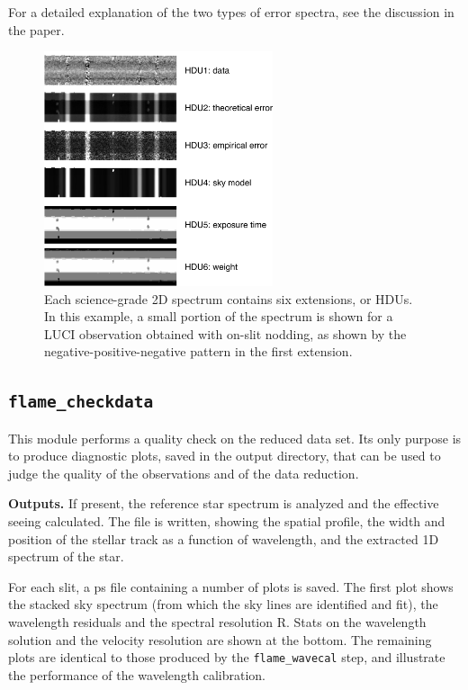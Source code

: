 \documentclass[a4paper]{article}
\begin{document}
\begin{sloppypar}
For a detailed explanation of the two types of error spectra, see the discussion in the paper.

\begin{figure}[tbp]
\centering
\includegraphics[width=0.6\textwidth]{extensions}
\caption{Each science-grade 2D spectrum contains six extensions, or HDUs. In this example, a small portion of the spectrum is shown for a LUCI observation obtained with on-slit nodding, as shown by the negative-positive-negative pattern in the first extension.}
\label{fig:extensions}
\end{figure}



\subsection{\texttt{flame\_checkdata}}
\label{sec:checkdata}

This module performs a quality check on the reduced data set. Its only purpose is to produce diagnostic plots, saved in the output directory, that can be used to judge the quality of the observations and of the data reduction.

\medskip
\noindent
\textbf{Outputs.} If present, the reference star spectrum is analyzed and the effective seeing calculated. The file  is written, showing the spatial profile, the width and position of the stellar track as a function of wavelength, and the extracted 1D spectrum of the star.

For each slit, a ps file containing a number of plots is saved. The first plot shows the stacked sky spectrum (from which the sky lines are identified and fit), the wavelength residuals and the spectral resolution R. Stats on the wavelength solution and the velocity resolution are shown at the bottom. The remaining plots are identical to those produced by the \texttt{flame\_wavecal} step, and illustrate the performance of the wavelength calibration.


\end{sloppypar}
\end{document}
